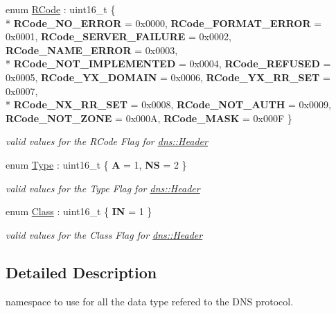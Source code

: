 \begin{DoxyCompactItemize}
\item 
enum \hyperlink{namespacedns_ad9381dbe4cb95fcff8d401fdad88021f}{R\+Code} \+: uint16\+\_\+t \{ \\*
{\bfseries R\+Code\+\_\+\+N\+O\+\_\+\+E\+R\+R\+OR} = 0x0000, 
{\bfseries R\+Code\+\_\+\+F\+O\+R\+M\+A\+T\+\_\+\+E\+R\+R\+OR} = 0x0001, 
{\bfseries R\+Code\+\_\+\+S\+E\+R\+V\+E\+R\+\_\+\+F\+A\+I\+L\+U\+RE} = 0x0002, 
{\bfseries R\+Code\+\_\+\+N\+A\+M\+E\+\_\+\+E\+R\+R\+OR} = 0x0003, 
\\*
{\bfseries R\+Code\+\_\+\+N\+O\+T\+\_\+\+I\+M\+P\+L\+E\+M\+E\+N\+T\+ED} = 0x0004, 
{\bfseries R\+Code\+\_\+\+R\+E\+F\+U\+S\+ED} = 0x0005, 
{\bfseries R\+Code\+\_\+\+Y\+X\+\_\+\+D\+O\+M\+A\+IN} = 0x0006, 
{\bfseries R\+Code\+\_\+\+Y\+X\+\_\+\+R\+R\+\_\+\+S\+ET} = 0x0007, 
\\*
{\bfseries R\+Code\+\_\+\+N\+X\+\_\+\+R\+R\+\_\+\+S\+ET} = 0x0008, 
{\bfseries R\+Code\+\_\+\+N\+O\+T\+\_\+\+A\+U\+TH} = 0x0009, 
{\bfseries R\+Code\+\_\+\+N\+O\+T\+\_\+\+Z\+O\+NE} = 0x000A, 
{\bfseries R\+Code\+\_\+\+M\+A\+SK} = 0x000F
 \}\hypertarget{namespacedns_ad9381dbe4cb95fcff8d401fdad88021f}{}\label{namespacedns_ad9381dbe4cb95fcff8d401fdad88021f}
\begin{DoxyCompactList}\small\item\em valid values for the R\+Code Flag for \hyperlink{structdns_1_1Header}{dns\+::\+Header} \end{DoxyCompactList}
\item 
enum \hyperlink{namespacedns_a2f53daa27510b0ea61122af921bb66c7}{Type} \+: uint16\+\_\+t \{ {\bfseries A} = 1, 
{\bfseries NS} = 2
 \}\hypertarget{namespacedns_a2f53daa27510b0ea61122af921bb66c7}{}\label{namespacedns_a2f53daa27510b0ea61122af921bb66c7}
\begin{DoxyCompactList}\small\item\em valid values for the Type Flag for \hyperlink{structdns_1_1Header}{dns\+::\+Header} \end{DoxyCompactList}
\item 
enum \hyperlink{namespacedns_a90321cc8e6ade0bea4be3fee56d3cef2}{Class} \+: uint16\+\_\+t \{ {\bfseries IN} = 1
 \}\hypertarget{namespacedns_a90321cc8e6ade0bea4be3fee56d3cef2}{}\label{namespacedns_a90321cc8e6ade0bea4be3fee56d3cef2}
\begin{DoxyCompactList}\small\item\em valid values for the Class Flag for \hyperlink{structdns_1_1Header}{dns\+::\+Header} \end{DoxyCompactList}
\end{DoxyCompactItemize}


\subsection{Detailed Description}
namespace to use for all the data type refered to the D\+NS protocol. 